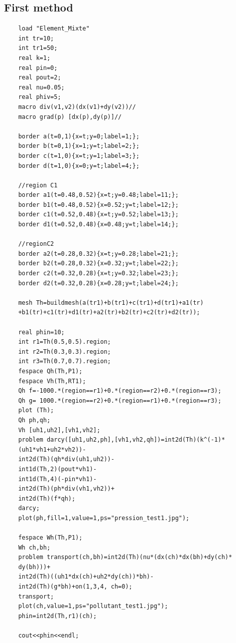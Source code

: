 \documentclass[]{report}
\begin{document}
\subsection{First method}
\begin{lstlisting}
	load "Element_Mixte"
	int tr=10;
	int tr1=50;
	real k=1;
	real pin=0;
	real pout=2;
	real nu=0.05;
	real phiv=5;
	macro div(v1,v2)(dx(v1)+dy(v2))//
	macro grad(p) [dx(p),dy(p)]//

	border a(t=0,1){x=t;y=0;label=1;};
	border b(t=0,1){x=1;y=t;label=2;};
	border c(t=1,0){x=t;y=1;label=3;};
	border d(t=1,0){x=0;y=t;label=4;};

	//region C1
	border a1(t=0.48,0.52){x=t;y=0.48;label=11;};
	border b1(t=0.48,0.52){x=0.52;y=t;label=12;};
	border c1(t=0.52,0.48){x=t;y=0.52;label=13;};
	border d1(t=0.52,0.48){x=0.48;y=t;label=14;};

	//regionC2
	border a2(t=0.28,0.32){x=t;y=0.28;label=21;};
	border b2(t=0.28,0.32){x=0.32;y=t;label=22;};
	border c2(t=0.32,0.28){x=t;y=0.32;label=23;};
	border d2(t=0.32,0.28){x=0.28;y=t;label=24;};

	mesh Th=buildmesh(a(tr1)+b(tr1)+c(tr1)+d(tr1)+a1(tr)
	+b1(tr)+c1(tr)+d1(tr)+a2(tr)+b2(tr)+c2(tr)+d2(tr));

	real phin=10;
	int r1=Th(0.5,0.5).region;
	int r2=Th(0.3,0.3).region;
	int r3=Th(0.7,0.7).region;
	fespace Qh(Th,P1);
	fespace Vh(Th,RT1);
	Qh f=-1000.*(region==r1)+0.*(region==r2)+0.*(region==r3);
	Qh g= 1000.*(region==r2)+0.*(region==r1)+0.*(region==r3);
	plot (Th);
	Qh ph,qh;
	Vh [uh1,uh2],[vh1,vh2];
	problem darcy([uh1,uh2,ph],[vh1,vh2,qh])=int2d(Th)(k^(-1)*
	(uh1*vh1+uh2*vh2))-
	int2d(Th)(qh*div(uh1,uh2))-
	int1d(Th,2)(pout*vh1)-
	int1d(Th,4)(-pin*vh1)-
	int2d(Th)(ph*div(vh1,vh2))+
	int2d(Th)(f*qh);
	darcy;
	plot(ph,fill=1,value=1,ps="pression_test1.jpg");

	fespace Wh(Th,P1);
	Wh ch,bh;
	problem	transport(ch,bh)=int2d(Th)(nu*(dx(ch)*dx(bh)+dy(ch)*
	dy(bh)))+
	int2d(Th)((uh1*dx(ch)+uh2*dy(ch))*bh)-
	int2d(Th)(g*bh)+on(1,3,4, ch=0);
	transport;
	plot(ch,value=1,ps="pollutant_test1.jpg");
	phin=int2d(Th,r1)(ch);

	cout<<phin<<endl;

\end{lstlisting}
\end{document}
